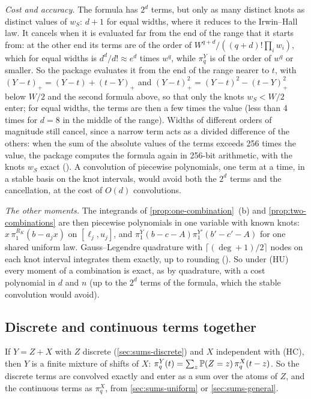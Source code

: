 \documentclass[11pt,a4paper]{article}
\numberwithin{equation}{section}
\newcommand{\pos}[1]{(#1)_+}            %
\newcommand{\slt}[2]{\pi^{#1}_{#2}}      %
\newcommand{\Hyp}[1]{\textup{(H#1)}}    %
\begin{document}
\emph{Cost and accuracy.}
The formula has $2^d$ terms, but only as many distinct knots as distinct values of $w_S$:
$d + 1$ for equal widths, where it reduces to the Irwin--Hall law.
It cancels when it is evaluated far from the end of the range that it starts from:
at the other end its terms are of the order of $W^{q+d}/((q + d)!\prod_i w_i)$, which for equal widths is $d^d/d! \approx e^d$ times $w^q$, while $\slt Yq$ is of the order of $w^q$ or smaller.
So the package evaluates it from the end of the range nearer to $t$,
with $\pos{Y - t} = (Y - t) + \pos{t - Y}$ and $\pos{Y - t}^2 = (Y - t)^2 - \pos{t - Y}^2$ below $W/2$ and the second formula above,
so that only the knots $w_S < W/2$ enter;
for equal widths, the terms are then a few times the value (less than 4 times for $d = 8$ in the middle of the range).
Widths of different orders of magnitude still cancel, since a narrow term acts as a divided difference of the others:
when the sum of the absolute values of the terms exceeds 256 times the value, the package computes the formula again in 256-bit  arithmetic, with the knots $w_S$ exact ().
A convolution of piecewise polynomials, one term at a time, in a stable basis on the knot intervals, would avoid both the $2^d$ terms and the cancellation, at the cost of $O(d)$ convolutions.

\emph{The other moments.}
The integrands of \cref{prop:one-combination}~(b) and \cref{prop:two-combinations} are then piecewise polynomials in one variable with known knots:
$x\,\slt{R_K}1(b - a_jx)$ on $[\ell_j, u_j]$, and $\slt Y1(b - c - A)\slt{Y'}1(b' - c' - A)$ for one shared uniform law.
Gauss--Legendre quadrature with $\lceil (\deg + 1)/2\rceil$ nodes on each knot interval integrates them exactly, up to rounding ().
So under \Hyp{U} every moment of a combination is exact, as by quadrature, with a cost polynomial in $d$ and $n$ (up to the $2^d$ terms of the formula, which the stable convolution would avoid).

\subsection{Discrete and continuous terms together}
\label{sec:sums-mixed}

If $Y = Z + X$ with $Z$ discrete (\cref{sec:sums-discrete}) and $X$ independent with \Hyp{C}, then $Y$ is a finite mixture of shifts of $X$:
$\slt Yq(t) = \sum_z \Prob(Z = z)\,\slt Xq(t - z)$.
So the discrete terms are convolved exactly and enter as a sum over the atoms of $Z$, and the continuous terms as $\slt Xq$, from \cref{sec:sums-uniform} or \cref{sec:sums-general}.
\end{document}
